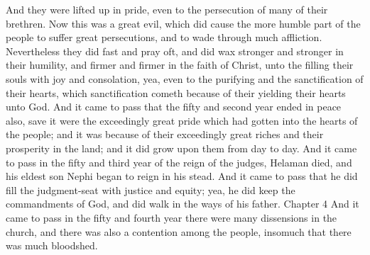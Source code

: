 And they were lifted up in pride, even to the persecution of many of their brethren. Now this was a great evil, which did cause the more humble part of the people to suffer great persecutions, and to wade through much affliction.
\bverse \iffalse Nevertheless they did fast and pray oft, and did wax stronger and stronger in their humility, and firmer and firmer in the faith of Christ, unto the filling their souls with joy and consolation, yea, even to the purifying and the sanctification of their hearts, which sanctification cometh because of their yielding their hearts unto God. \fi
Nevertheless they did fast and pray oft, and did wax stronger and stronger in their humility, and firmer and firmer in the faith of Christ, unto the filling their souls with joy and consolation, yea, even to the purifying and the sanctification of their hearts, which sanctification cometh because of their yielding their hearts unto God.
\bverse \iffalse And it came to pass that the fifty and second year ended in peace also, save it were the exceedingly great pride which had gotten into the hearts of the people; and it was because of their exceedingly great riches and their prosperity in the land; and it did grow upon them from day to day. \fi
And it came to pass that the fifty and second year ended in peace also, save it were the exceedingly great pride which had gotten into the hearts of the people; and it was because of their exceedingly great riches and their prosperity in the land; and it did grow upon them from day to day.
\bverse \iffalse And it came to pass in the fifty and third year of the reign of the judges, Helaman died, and his eldest son Nephi began to reign in his stead. And it came to pass that he did fill the judgment-seat with justice and equity; yea, he did keep the commandments of God, and did walk in the ways of his father. \fi
And it came to pass in the fifty and third year of the reign of the judges, Helaman died, and his eldest son Nephi began to reign in his stead. And it came to pass that he did fill the judgment-seat with justice and equity; yea, he did keep the commandments of God, and did walk in the ways of his father.
Chapter 4
\bchapter
\bverse \iffalse And it came to pass in the fifty and fourth year there were many dissensions in the church, and there was also a contention among the people, insomuch that there was much bloodshed. \fi
And it came to pass in the fifty and fourth year there were many dissensions in the church, and there was also a contention among the people, insomuch that there was much bloodshed.
